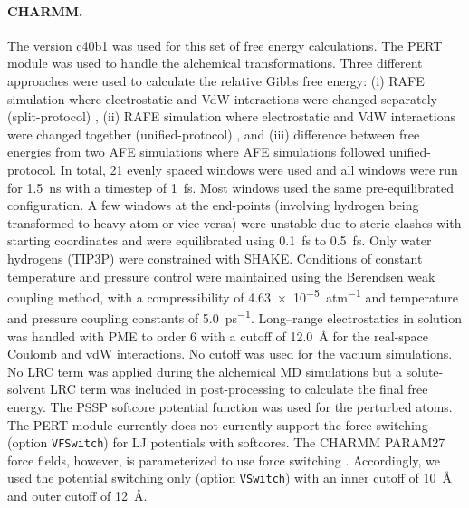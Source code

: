 \documentclass[journal=jctcce,manuscript=article]{achemso}
\newcommand{\inpopt}[1]{\texttt{#1}}
\begin{document}
\paragraph{CHARMM.}
The version c40b1 was used for this set of free energy calculations.
The PERT module was used to handle the alchemical transformations.
%
Three different approaches were used to calculate the relative Gibbs free energy: (i) RAFE simulation where electrostatic and VdW interactions were changed separately (split-protocol) , (ii) RAFE simulation where electrostatic and VdW interactions were changed together (unified-protocol) , and (iii) difference between free energies from two AFE simulations where AFE simulations followed unified-protocol.
%
In total, 21 evenly spaced windows were used and all windows were run for \SI{1.5}{ns} with a timestep of \SI{1}{fs}.
Most windows used the same pre-equilibrated configuration.
A few windows at the end-points (involving hydrogen being transformed to heavy atom or vice versa) were unstable due to steric clashes with starting coordinates and were equilibrated using \SI{0.1}{fs} to \SI{0.5}{fs}.
%
Only water hydrogens (TIP3P) were constrained with SHAKE.
%
Conditions of constant temperature and pressure control were maintained using the Berendsen weak coupling method,
with a compressibility of \SI{4.63e-5}{atm^{-1}} and temperature and pressure coupling constants of \SI{5.0}{ps^{-1}}.
%
Long--range electrostatics in solution was handled with PME to order 6 with a cutoff of \SI{12.0}{\angstrom} for the real-space Coulomb and vdW interactions.
No cutoff was used for the vacuum simulations.
%
 No LRC term was applied during the alchemical MD simulations but a solute-solvent LRC term was included in post-processing to calculate the final free energy.
%
The PSSP softcore potential function was used for the perturbed atoms.
The PERT module currently does not currently support the force switching (option \inpopt{VFSwitch}) for LJ potentials with softcores.
The CHARMM PARAM27 force fields, however, is parameterized to use force switching \cite{JCC:JCC21287}.
Accordingly, we used the potential switching only (option \inpopt{VSwitch}) with an inner cutoff of \SI{10}{\angstrom} and outer cutoff of \SI{12}{\angstrom}.
\end{document}
